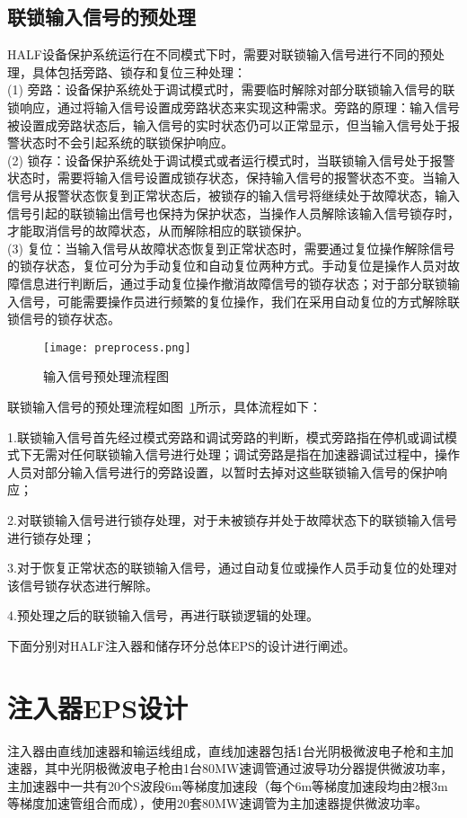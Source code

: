 \subsection{联锁输入信号的预处理}

HALF设备保护系统运行在不同模式下时，需要对联锁输入信号进行不同的预处理，具体包括旁路、锁存和复位三种处理\cite{chou2008}：\\
(1) 旁路：设备保护系统处于调试模式时，需要临时解除对部分联锁输入信号的联锁响应，通过将输入信号设置成旁路状态来实现这种需求。旁路的原理：输入信号被设置成旁路状态后，输入信号的实时状态仍可以正常显示，但当输入信号处于报警状态时不会引起系统的联锁保护响应。\\
(2) 锁存：设备保护系统处于调试模式或者运行模式时，当联锁输入信号处于报警状态时，需要将输入信号设置成锁存状态，保持输入信号的报警状态不变。当输入信号从报警状态恢复到正常状态后，被锁存的输入信号将继续处于故障状态，输入信号引起的联锁输出信号也保持为保护状态，当操作人员解除该输入信号锁存时，才能取消信号的故障状态，从而解除相应的联锁保护。\\
(3) 复位：当输入信号从故障状态恢复到正常状态时，需要通过复位操作解除信号的锁存状态，复位可分为手动复位和自动复位两种方式。手动复位是操作人员对故障信息进行判断后，通过手动复位操作撤消故障信号的锁存状态；对于部分联锁输入信号，可能需要操作员进行频繁的复位操作，我们在采用自动复位的方式解除联锁信号的锁存状态。

\begin{figure}[!htb]
	\centering
	\texttt{[image: preprocess.png]}
	\caption{输入信号预处理流程图}
	\label{fig:preprocess}
\end{figure}

联锁输入信号的预处理流程如图~\ref{fig:preprocess}所示，具体流程如下：

1.联锁输入信号首先经过模式旁路和调试旁路的判断，模式旁路指在停机或调试模式下无需对任何联锁输入信号进行处理；调试旁路是指在加速器调试过程中，操作人员对部分输入信号进行的旁路设置，以暂时去掉对这些联锁输入信号的保护响应；

2.对联锁输入信号进行锁存处理，对于未被锁存并处于故障状态下的联锁输入信号进行锁存处理；

3.对于恢复正常状态的联锁输入信号，通过自动复位或操作人员手动复位的处理对该信号锁存状态进行解除。

4.预处理之后的联锁输入信号，再进行联锁逻辑的处理。


下面分别对HALF注入器和储存环分总体EPS的设计进行阐述。

\section{注入器EPS设计}
\label{section:注入器EPS设计}
注入器由直线加速器和输运线组成，直线加速器包括1台光阴极微波电子枪和主加速器，其中光阴极微波电子枪由1台80MW速调管通过波导功分器提供微波功率，主加速器中一共有20个S波段6m等梯度加速段（每个6m等梯度加速段均由2根3m等梯度加速管组合而成），使用20套80MW速调管为主加速器提供微波功率。

